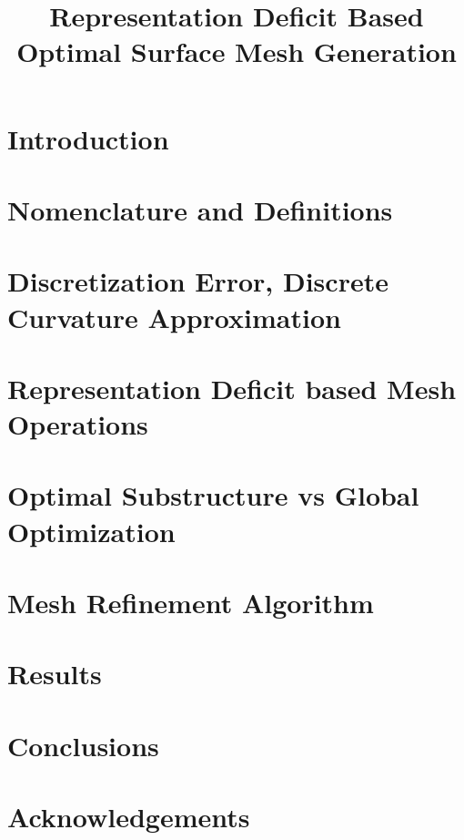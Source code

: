 \documentclass[11pt]{article}
\begin{document}
\title{Representation Deficit Based Optimal Surface Mesh Generation}
\maketitle

\section{Introduction}


\section{Nomenclature and Definitions}


\section{Discretization Error, Discrete Curvature Approximation}


\section{Representation Deficit based Mesh Operations}


\section{Optimal Substructure vs Global Optimization}


\section{Mesh Refinement Algorithm}


\section{Results}

\section{Conclusions}

\section{Acknowledgements}



\end{document}
